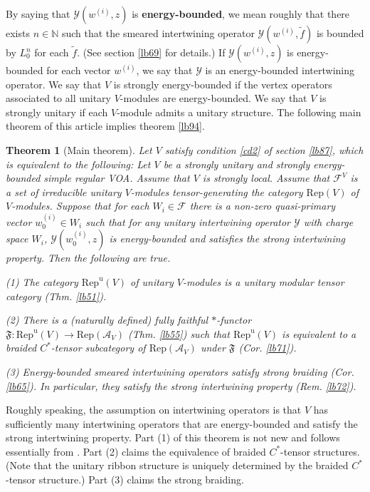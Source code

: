 \documentclass[11pt,b5paper,notitlepage]{article}
\theoremstyle{definition}
\theoremstyle{plain}
\newtheorem{thmn}{Theorem}
\newcommand{\fk}{\mathfrak}
\newcommand{\mc}{\mathcal}
\newcommand{\wtd}{\widetilde}
\newcommand{\Rep}{\mathrm{Rep}}
\newcommand{\RepV}{\mathrm{Rep}(V)}
\newcommand{\RepuV}{\mathrm{Rep}^{\mathrm u}(V)}
\newcommand{\mbb}{\mathbb}
\numberwithin{equation}{subsection}
\begin{document}
By saying that $\mc Y(w^{(i)},z)$ is \textbf{energy-bounded}, we mean roughly that there exists $n\in\mbb N$ such that the smeared intertwining operator $\mc Y(w^{(i)},\wtd f)$ is bounded by $L_0^n$ for each $\wtd f$. (See section \ref{lb69} for details.) If $\mc Y(w^{{(i)}},z)$ is energy-bounded for each vector $w^{(i)}$, we say that $\mc Y$ is an energy-bounded intertwining operator. We say that $V$ is strongly energy-bounded if the vertex operators associated to all unitary $V$-modules  are energy-bounded. We say that $V$ is strongly unitary if each $V$-module admits a unitary structure. The following main theorem of this article implies theorem \ref{lb94}.

\begin{thmn}[Main theorem]\label{lb73}	Let $V$ satisfy condition \ref{cd2} of section \ref{lb87}, which is equivalent to the following: Let $V$ be a strongly unitary and strongly energy-bounded simple regular VOA. Assume that $V$ is strongly local. Assume that $\mc F^V$ is a set of irreducible unitary $V$-modules tensor-generating the category $\RepV$ of $V$-modules. Suppose that for each $W_i\in\mc F$ there is a non-zero quasi-primary vector $w^{(i)}_0\in W_i$ such that for any unitary intertwining operator $\mc Y$ with charge space $W_i$, $\mc Y(w^{(i)}_0,z)$ is energy-bounded and satisfies the strong intertwining property. Then the following are true.
	
(1) The category $\RepuV$ of unitary $V$-modules is a unitary modular tensor category (Thm. \ref{lb51}).
	
(2) There is a (naturally defined) fully faithful $*$-functor $\fk F:\RepuV\rightarrow\Rep(\mc A_V)$ (Thm. \ref{lb55}) such that $\RepuV$ is equivalent to a braided $C^*$-tensor subcategory of $\Rep(\mc A_V)$ under $\fk F$ (Cor. \ref{lb71}).
	
(3) Energy-bounded smeared intertwining operators satisfy strong braiding (Cor. \ref{lb65}). In particular, they satisfy the strong intertwining property (Rem. \ref{lb72}).
\end{thmn}

Roughly speaking, the assumption on intertwining operators is that $V$ has sufficiently many intertwining operators that are energy-bounded and satisfy the strong intertwining property. Part (1) of this theorem is not new and follows essentially from \cite{Gui19a,Gui19b}. Part (2) claims the equivalence of braided $C^*$-tensor structures. (Note that the unitary ribbon structure is uniquely determined by the  braided $C^*$-tensor structure.) Part (3) claims the strong braiding.
\end{document}
